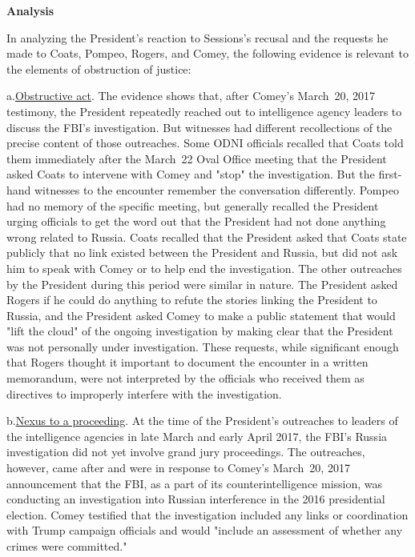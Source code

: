 \begin{center}
\textbf{Analysis}
\end{center}

In analyzing the President's reaction to Sessions's recusal and the requests he made to Coats, Pompeo, Rogers, and Comey, the following evidence is relevant to the elements of obstruction of justice:

a.\qquad\underline{Obstructive act}.
The evidence shows that, after Comey's March~20, 2017 testimony, the President repeatedly reached out to intelligence agency leaders to discuss the FBI's investigation.
But witnesses had different recollections of the precise content of those outreaches.
Some ODNI officials recalled that Coats told them immediately after the March~22 Oval Office meeting that the President asked Coats to intervene with Comey and "stop" the investigation.
But the first-hand witnesses to the encounter remember the conversation differently.
Pompeo had no memory of the specific meeting, but generally recalled the President urging officials to get the word out that the President had not done anything wrong related to Russia.
Coats recalled that the President asked that Coats state publicly that no link existed between the President and Russia, but did not ask him to speak with Comey or to help end the investigation.
The other outreaches by the President during this period were similar in nature.
The President asked Rogers if he could do anything to refute the stories linking the President to Russia, and the President asked Comey to make a public statement that would "lift the cloud" of the ongoing investigation by making clear that the President was not personally under investigation.
These requests, while significant enough that Rogers thought it important to document the encounter in a written memorandum, were not
interpreted by the officials who received them as directives to improperly interfere with the investigation.

b.\qquad\underline{Nexus to a proceeding}.
At the time of the President's outreaches to leaders of the intelligence agencies in late March and early April 2017, the FBI's Russia investigation did not yet involve grand jury proceedings.
The outreaches, however, came after and were in response to Comey's March~20, 2017 announcement that the FBI, as a part of its counterintelligence mission, was conducting an investigation into Russian interference in the 2016 presidential election.
Comey testified that the investigation included any links or coordination with Trump campaign officials and would "include an assessment of whether any crimes were committed."

